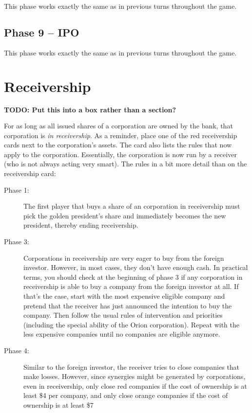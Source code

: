 \documentclass[10pt,final]{report}
\begin{document}
\begin{multicols}{2}
This phase works exactly the same as in previous turns throughout the
game.

\subsection{Phase 9 -- IPO}

This phase works exactly the same as in previous turns throughout the
game.

\section{Receivership}
\label{rec}

\textbf{TODO: Put this into a box rather than a section?}

For as long as all issued shares of a corporation are owned by the
bank, that corporation is \emph{in receivership}. As a reminder, place
one of the red receivership cards next to the corporation's
assets. The card also lists the rules that now apply to the
corporation. Essentially, the corporation is now run by a receiver
(who is not always acting very smart). The rules in a bit more detail
than on the receivership card:
\begin{description}
\item[Phase 1:] The first player that buys a share of an corporation
  in receivership must pick the golden president's share and
  immediately becomes the new president, thereby ending receivership.
\item[Phase 3:] Corporations in receivership are very eager to buy
  from the foreign investor. However, in most cases, they don't have
  enough cash. In practical terms, you should check at the beginning
  of phase 3 if any corporation in receivership is able to buy a
  company from the foreign investor at all. If that's the case, start
  with the most expensive eligible company and pretend that the
  receiver has just announced the intention to buy the company. Then
  follow the usual rules of intervention and priorities (including the
  special ability of the Orion corporation). Repeat with the less
  expensive companies until no companies are eligible anymore.
\item[Phase 4:] Similar to the foreign investor, the receiver tries to
  close companies that make losses. However, since synergies might be
  generated by corporations, even in receivership, only close red
  companies if the cost of ownership is at least \$4 per company, and
  only close orange companies if the cost of ownership is at least \$7

\end{description}
\end{multicols}
\end{document}
